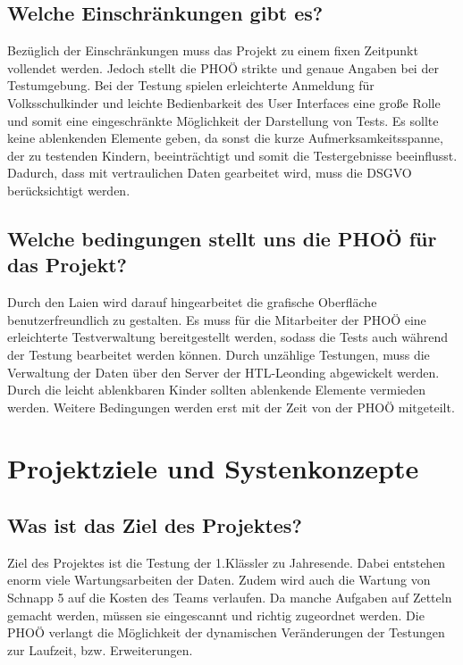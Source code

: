 \documentclass[12pt]{article}
\theoremstyle{definition}
\begin{document}
\subsection{Welche Einschränkungen gibt es?}

Bezüglich der Einschränkungen muss das Projekt zu einem fixen Zeitpunkt vollendet werden. Jedoch stellt die PHOÖ strikte und genaue Angaben bei der Testumgebung. Bei der Testung spielen erleichterte Anmeldung für Volksschulkinder und leichte Bedienbarkeit des User Interfaces eine große Rolle und somit eine eingeschränkte Möglichkeit der Darstellung von Tests. Es sollte keine ablenkenden Elemente geben, da sonst die kurze Aufmerksamkeitsspanne, der zu testenden Kindern, beeinträchtigt und somit die Testergebnisse beeinflusst.
Dadurch, dass mit vertraulichen Daten gearbeitet wird, muss die DSGVO berücksichtigt werden.


\subsection{Welche bedingungen stellt uns die PHOÖ für das Projekt?}

Durch den Laien wird darauf hingearbeitet die grafische Oberfläche benutzerfreundlich zu gestalten. Es muss für die Mitarbeiter der PHOÖ eine erleichterte Testverwaltung bereitgestellt werden, sodass die Tests auch während der Testung bearbeitet werden können. Durch unzählige Testungen, muss die Verwaltung der Daten über den Server der HTL-Leonding abgewickelt werden. Durch die leicht ablenkbaren Kinder sollten ablenkende Elemente vermieden werden. Weitere Bedingungen werden erst mit der Zeit von der PHOÖ mitgeteilt.


\pagebreak

\section{Projektziele und Systenkonzepte}

\subsection{Was ist das Ziel des Projektes?}

Ziel des Projektes ist die Testung der 1.Klässler zu Jahresende. Dabei entstehen enorm viele Wartungsarbeiten der Daten. Zudem wird auch die Wartung von Schnapp 5 auf die Kosten des Teams verlaufen. Da manche Aufgaben auf Zetteln gemacht werden, müssen sie eingescannt und richtig zugeordnet werden. Die PHOÖ verlangt die Möglichkeit der dynamischen Veränderungen der Testungen zur Laufzeit, bzw. Erweiterungen. 
\end{document}
